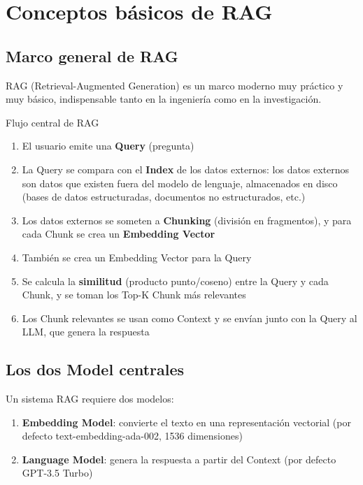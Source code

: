 \section{Conceptos básicos de RAG}

\subsection{Marco general de RAG}

RAG (Retrieval-Augmented Generation) es un marco moderno muy práctico y muy básico, indispensable tanto en la ingeniería como en la investigación.

\begin{importantbox}{Flujo central de RAG}
\begin{enumerate}
    \item El usuario emite una \textbf{Query} (pregunta)
    \item La Query se compara con el \textbf{Index} de los datos externos: los datos externos son datos que existen fuera del modelo de lenguaje, almacenados en disco (bases de datos estructuradas, documentos no estructurados, etc.)
    \item Los datos externos se someten a \textbf{Chunking} (división en fragmentos), y para cada Chunk se crea un \textbf{Embedding Vector}
    \item También se crea un Embedding Vector para la Query
    \item Se calcula la \textbf{similitud} (producto punto/coseno) entre la Query y cada Chunk, y se toman los Top-K Chunk más relevantes
    \item Los Chunk relevantes se usan como Context y se envían junto con la Query al LLM, que genera la respuesta
\end{enumerate}
\end{importantbox}

\subsection{Los dos Model centrales}

Un sistema RAG requiere dos modelos:
\begin{enumerate}
    \item \textbf{Embedding Model}: convierte el texto en una representación vectorial (por defecto text-embedding-ada-002, 1536 dimensiones)
    \item \textbf{Language Model}: genera la respuesta a partir del Context (por defecto GPT-3.5 Turbo)
\end{enumerate}


